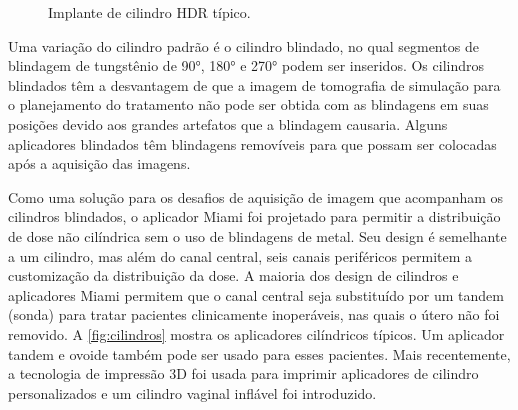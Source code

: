 \documentclass[11pt,a4paper]{article}
\begin{document}
	\begin{figure}[h]
		\centering
		\caption{Implante de cilindro HDR típico.}
		\label{fig:implanteCilindro}
	\end{figure}

	Uma variação do cilindro padrão é o cilindro blindado, no qual segmentos de blindagem de tungstênio de \ang{90}, \ang{180} e \ang{270} podem ser inseridos. Os cilindros blindados têm a desvantagem de que a imagem de tomografia de simulação para o planejamento do tratamento não pode ser obtida com as blindagens em suas posições devido aos grandes artefatos que a blindagem causaria. Alguns aplicadores blindados têm blindagens removíveis para que possam ser colocadas após a aquisição das imagens. 
	
	Como uma solução para os desafios de aquisição de imagem que acompanham os cilindros blindados, o aplicador Miami foi projetado para permitir a distribuição de dose não cilíndrica sem o uso de blindagens de metal. Seu design é semelhante a um cilindro, mas além do canal central, seis canais periféricos permitem a customização da distribuição da dose. A maioria dos design de cilindros e aplicadores Miami permitem que o canal central seja substituído por um tandem (sonda) para tratar pacientes clinicamente inoperáveis, nas quais o útero não foi removido. A \ref{fig:cilindros} mostra os aplicadores cilíndricos típicos. Um aplicador tandem e ovoide também pode ser usado para esses pacientes. Mais recentemente, a tecnologia de impressão 3D foi usada para imprimir aplicadores de cilindro personalizados e um cilindro vaginal inflável foi introduzido.
	
\end{document}
